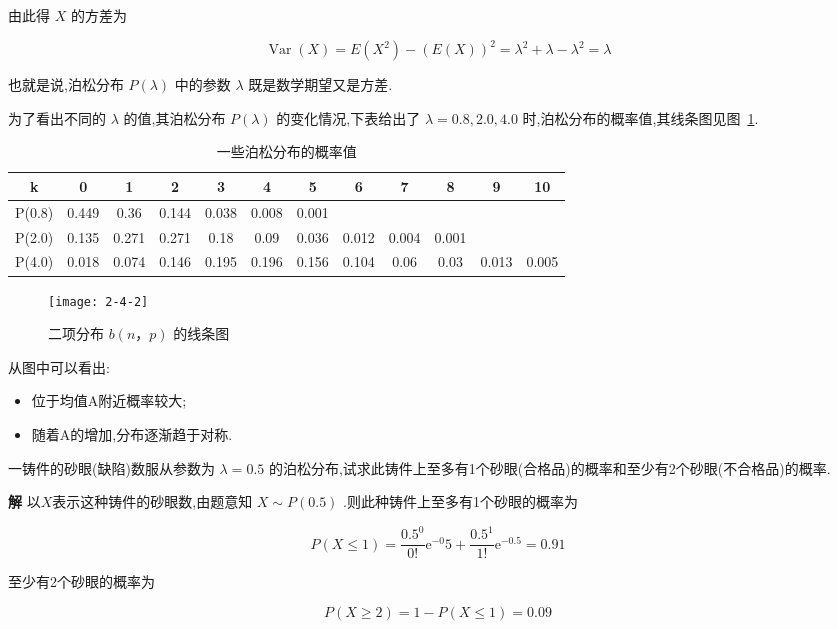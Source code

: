 由此得 $ X $ 的方差为

\[
\operatorname{Var}(X)=E\left(X^{2}\right)-(E(X))^{2}=\lambda^{2}+\lambda-\lambda^{2}=\lambda
\]

也就是说,泊松分布 $ P(\lambda) $ 中的参数 $ \lambda $ 既是数学期望又是方差.

为了看出不同的 $ \lambda $ 的值,其泊松分布 $ P(\lambda) $ 的变化情况,下表给出了 $ \lambda =
0.8,2.0,4.0 $ 时,泊松分布的概率值,其线条图见图~\ref{fig:2-4-2}.

\begin{table}[htbp]
	\centering
	\caption{一些泊松分布的概率值}
	\begin{tabular}{c|ccccccccccc}
		\toprule
		k     & 0     & 1     & 2     & 3     & 4     & 5     & 6     & 7     & 8     & 9     & 10 \\\midrule
		P(0.8) & 0.449 & 0.36  & 0.144 & 0.038 & 0.008 & 0.001 &       &       &       &       &  \\
		P(2.0) & 0.135 & 0.271 & 0.271 & 0.18  & 0.09  & 0.036 & 0.012 & 0.004 & 0.001 &       &  \\
		P(4.0) & 0.018 & 0.074 & 0.146 & 0.195 & 0.196 & 0.156 & 0.104 & 0.06  & 0.03  & 0.013 & 0.005 \\\bottomrule
	\end{tabular}%
	\label{tab:2.4.2}%
\end{table}%

\begin{figure}
	\centering
	\texttt{[image: 2-4-2]}
	\caption{二项分布 $ b(n，p) $ 的线条图}
	\label{fig:2-4-2}
\end{figure}

从图中可以看出:

\begin{itemize}
	\item 位于均值A附近概率较大;
	\item 随着A的增加,分布逐渐趋于对称.
\end{itemize}

\begin{example}
	一铸件的砂眼(缺陷)数服从参数为 $ \lambda=0.5 $ 的泊松分布,试求此铸件上至多有1个砂眼(合格品)的概率和至少有2个砂眼(不合格品)的概率.
	
\textbf{解} 以$ X $表示这种铸件的砂眼数,由题意知 $ X \sim P(0.5) $ .则此种铸件上至多有1个砂眼的概率为

\[
P(X \leqslant 1)=\frac{0.5^{0}}{0 !} \mathrm{e}^{-0} 5+\frac{0.5^{1}}{1 !} \mathrm{e}^{-0.5}=0.91
\]

至少有2个砂眼的概率为

\[
P(X \geqslant 2)=1-P(X \leqslant 1)=0.09
\]
\end{example}

